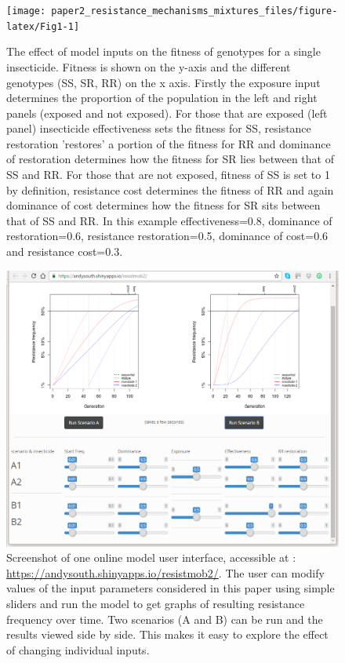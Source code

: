 \documentclass[11pt,]{article}
\begin{document}
\begin{figure}

\texttt{[image: paper2\_resistance\_mechanisms\_mixtures\_files/figure-latex/Fig1-1]} \hfill{}

\caption{The effect of model inputs on the fitness of genotypes for a single insecticide. Fitness is shown on the y-axis and the different genotypes (SS, SR, RR) on the x axis. Firstly the exposure input determines the proportion of the population in the left and right panels (exposed and not exposed). For those that are exposed (left panel) insecticide effectiveness sets the fitness for SS, resistance restoration 'restores' a portion of the fitness for RR and dominance of restoration determines how the fitness for SR lies between that of SS and RR. For those that are not exposed, fitness of SS is set to 1 by definition, resistance cost determines the fitness of RR and again dominance of cost determines how the fitness for SR sits between that of SS and RR. In this example effectiveness=0.8, dominance of restoration=0.6, resistance restoration=0.5, dominance of cost=0.6 and resistance cost=0.3.}\label{fig:Fig1}
\end{figure}

\begin{figure}[htbp]
\centering
\includegraphics{paper2_UI1.png}
\caption{Screenshot of one online model user interface, accessible at :
\url{https://andysouth.shinyapps.io/resistmob2/}. The user can modify
values of the input parameters considered in this paper using simple
sliders and run the model to get graphs of resulting resistance
frequency over time. Two scenarios (A and B) can be run and the results
viewed side by side. This makes it easy to explore the effect of
changing individual inputs.}
\end{figure}
\end{document}
